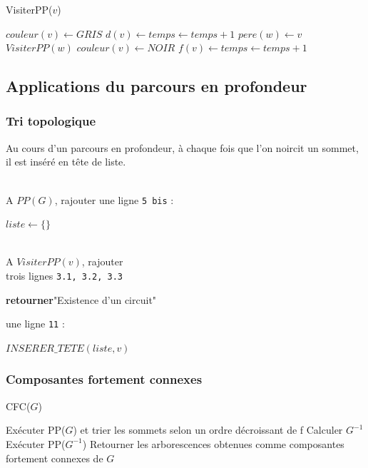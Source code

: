 \documentclass[11pt,a4paper]{report}
\renewcommand{\algorithmicreturn}{\textbf{retourner}}
\begin{document}
\begin{algorithm}
\caption{VisiterPP($v$)}
\begin{algorithmic}[1]
\STATE $couleur(v) \leftarrow GRIS$
\STATE $d(v) \leftarrow temps \leftarrow temps + 1$
\STATE $pere(w) \leftarrow v$
\STATE $VisiterPP(w)$
\ENDIF
\ENDFOR
\STATE $couleur(v) \leftarrow NOIR$
\STATE $f(v) \leftarrow temps \leftarrow temps + 1$
\end{algorithmic}
\end{algorithm}

\subsection{Applications du parcours en profondeur}

\subsubsection{Tri topologique}

Au cours d'un parcours en profondeur, à chaque fois que l'on noircit un sommet, il est inséré en tête de liste.

~\\
A $PP(G)$, rajouter une ligne {\tt 5 bis} :
\begin{algorithmic}[]
\STATE $liste \leftarrow \{\}$ 
\end{algorithmic}

~\\
A $VisiterPP(v)$, rajouter \\
trois lignes {\tt 3.1, 3.2, 3.3}
\begin{algorithmic}[]
\STATE  \algorithmicreturn "Existence d'un circuit"
\ENDIF
\end{algorithmic}
une ligne {\tt 11} :
\begin{algorithmic}[]
\STATE $INSERER\_TETE(liste, v)$ 
\end{algorithmic}

\subsubsection{Composantes fortement connexes}

\begin{algorithm}
\caption{CFC($G$)}
\begin{algorithmic}[1]
\STATE Exécuter PP($G$) et trier les sommets selon un ordre décroissant de f
\STATE Calculer $G^{-1}$
\STATE Exécuter PP($G^{-1}$)
\STATE Retourner les arborescences obtenues comme composantes fortement connexes de $G$
\end{algorithmic}
\end{algorithm}
\end{document}
